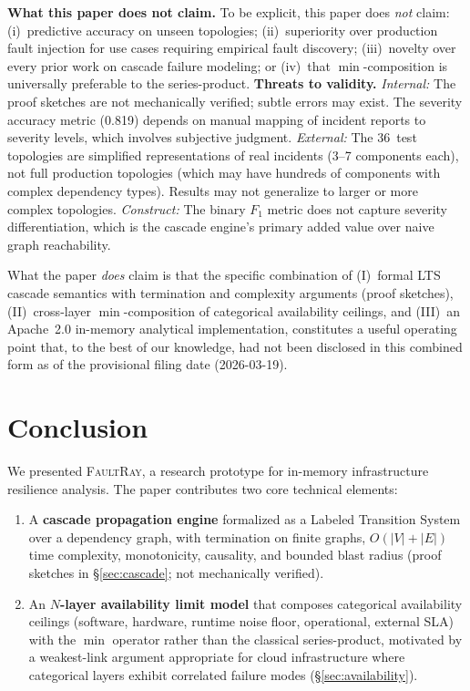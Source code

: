 \documentclass[10pt,twocolumn]{article}
\begin{document}
\textbf{What this paper does not claim.}
To be explicit, this paper does \emph{not} claim:
(i)~predictive accuracy on unseen topologies;
(ii)~superiority over production fault injection for use cases
requiring empirical fault discovery;
(iii)~novelty over every prior work on cascade failure modeling; or
(iv)~that $\min$-composition is universally preferable to the
series-product.
\textbf{Threats to validity.}
\emph{Internal:} The proof sketches are not mechanically verified;
subtle errors may exist. The severity accuracy metric (0.819)
depends on manual mapping of incident reports to severity levels,
which involves subjective judgment.
\emph{External:} The 36~test topologies are simplified
representations of real incidents (3--7 components each), not
full production topologies (which may have hundreds of components
with complex dependency types). Results may not generalize to
larger or more complex topologies.
\emph{Construct:} The binary $F_1$ metric does not capture
severity differentiation, which is the cascade engine's primary
added value over naive graph reachability.

What the paper \emph{does} claim is that the specific combination of
(I)~formal LTS cascade semantics with termination and complexity
arguments (proof sketches), (II)~cross-layer $\min$-composition of categorical
availability ceilings, and (III)~an Apache~2.0 in-memory analytical
implementation, constitutes a useful operating point that, to the
best of our knowledge, had not been disclosed in this combined form
as of the provisional filing date (2026-03-19).

\section{Conclusion}\label{sec:conclusion}

We presented \textsc{FaultRay}, a research prototype for in-memory
infrastructure resilience analysis. The paper contributes two core
technical elements:

\begin{enumerate}[nosep]
\item A \textbf{cascade propagation engine} formalized as a Labeled
  Transition System over a dependency graph, with termination
  on finite graphs, $O(|V| + |E|)$ time complexity, monotonicity,
  causality, and bounded blast radius (proof sketches in
  \S\ref{sec:cascade}; not mechanically verified).
\item An \textbf{$N$-layer availability limit model} that composes
  categorical availability ceilings (software, hardware, runtime
  noise floor, operational, external SLA) with the $\min$ operator rather than
  the classical series-product, motivated by a weakest-link argument
  appropriate for cloud infrastructure where categorical layers
  exhibit correlated failure modes (\S\ref{sec:availability}).
\end{enumerate}
\end{document}
